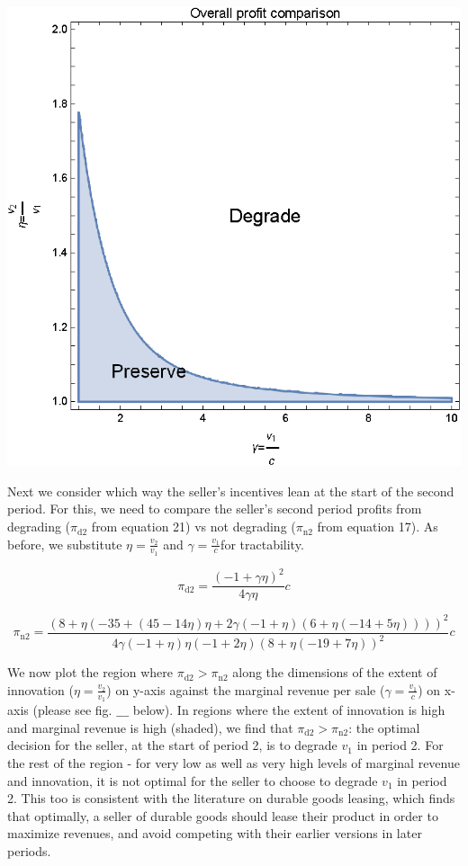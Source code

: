 \documentclass{article}
\begin{document}
\includegraphics{2020_05_19-overleaf-mirror_gr4.eps}

Next we consider which way the seller{'}s incentives lean at the start of the second period. For this, we need to compare the seller{'}s second period
profits from degrading (\(\pi _{\text{d2}}\) from equation 21) vs not degrading (\(\pi _{\text{n2}}\) from equation 17). As before, we substitute
\(\eta  =\frac{v_2}{v_1}\) and \(\gamma =\frac{v_1}{c}\)for tractability.

\[\pi _{\text{d2}}=\frac{ (-1+\gamma  \eta )^2}{4 \gamma  \eta }c\]

\[\pi _{\text{n2}}=\frac{(8+\eta  (-35+(45-14 \eta ) \eta +2 \gamma  (-1+\eta ) (6+\eta  (-14+5 \eta ))))^2}{4 \gamma  (-1+\eta ) \eta  (-1+2 \eta
) (8+\eta  (-19+7 \eta ))^2}c\]

We now plot the region where \(\pi _{\text{d2}}>\pi _{\text{n2}}\) along the dimensions of the extent of innovation (\(\eta =\frac{v_2}{v_1}\)) on
y-axis against the marginal revenue per sale (\(\gamma =\frac{v_1}{c}\)) on x-axis (please see fig. $\_\_\_$ below). In regions where the extent
of innovation is high and marginal revenue is high (shaded), we find that \(\pi _{\text{d2}}>\pi _{\text{n2}}\): the optimal decision for the seller,
at the start of period 2, is to degrade \(v_1\) in period 2. For the rest of the region - for very low as well as very high levels of marginal revenue
and innovation, it is not optimal for the seller to choose to degrade \(v_1\) in period 2. This too is consistent with the literature on durable
goods leasing, which finds that optimally, a seller of durable goods should lease their product in order to maximize revenues, and avoid competing
with their earlier versions in later periods.
\end{document}
